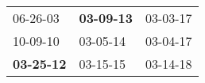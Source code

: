 \begin{supertabular}{p{0.33\columnwidth}p{0.33\columnwidth}p{0.33\columnwidth}}
          06-26-03\textsuperscript{} &  \textbf{03-09-13\textsuperscript{}} &  03-03-17\textsuperscript{} \\
          10-09-10\textsuperscript{} &           03-05-14\textsuperscript{} &  03-04-17\textsuperscript{} \\
 \textbf{03-25-12\textsuperscript{}} &           03-15-15\textsuperscript{} &  03-14-18\textsuperscript{} \\
\end{supertabular}
